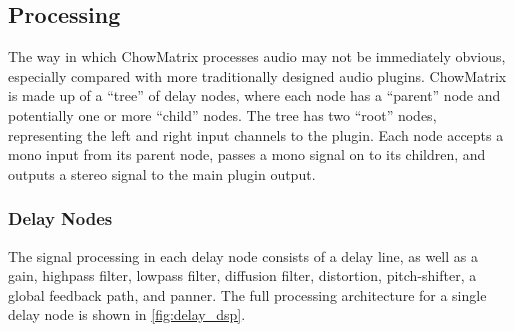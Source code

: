 \documentclass[landscape,twocolumn,a5paper]{manual}
\begin{document}
\subsection{Processing}
The way in which ChowMatrix processes audio may not
be immediately obvious, especially compared with more
traditionally designed audio plugins. ChowMatrix is made up
of a ``tree'' of delay nodes, where each node has a ``parent''
node and potentially one or more ``child'' nodes. The tree has
two ``root'' nodes, representing the left and right input
channels to the plugin. Each node accepts a mono input
from its parent node, passes a mono signal on to its children,
and outputs a stereo signal to the main plugin output.

\subsubsection{Delay Nodes}
The signal processing in each delay node consists of a
delay line, as well as a gain, highpass filter, lowpass
filter, diffusion filter, distortion, pitch-shifter, a
global feedback path, and panner. The full processing
architecture for a single delay node is shown in
\cref{fig:delay_dsp}.
\newpar
%
\end{document}
